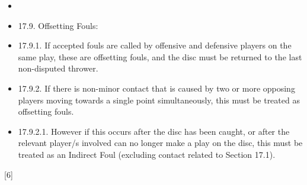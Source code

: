 \begin{itemize}
    \item 
    \item 17.9. Offsetting Fouls:
    \item 17.9.1. If accepted fouls are called by offensive and defensive players on the same play, these are offsetting fouls, and the disc must be returned to the last non-disputed thrower.
    \item 17.9.2. If there is non-minor contact that is caused by two or more opposing players moving towards a single point simultaneously, this must be treated as offsetting fouls.
    \item 17.9.2.1. However if this occurs after the disc has been caught, or after the relevant player/s involved can no longer make a play on the disc, this must be treated as an Indirect Foul (excluding contact related to Section 17.1).

\end{itemize}
\begin{center}[6]\end{center}
